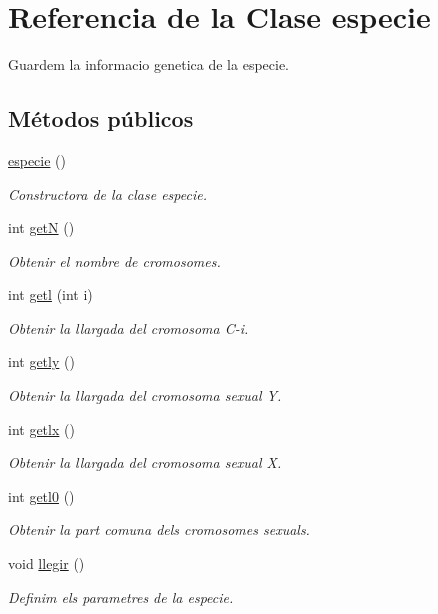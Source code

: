 \hypertarget{classespecie}{}\section{Referencia de la Clase especie}
\label{classespecie}


Guardem la informacio genetica de la especie.  


\subsection*{Métodos públicos}
\begin{DoxyCompactItemize}
\item 
\hyperlink{classespecie_ac172ff6414744de38a9995de5b8960e6}{especie} ()
\begin{DoxyCompactList}\small\item\em Constructora de la clase especie. \end{DoxyCompactList}\item 
int \hyperlink{classespecie_a16cbac301660254cf39ef7f51690e507}{getN} ()
\begin{DoxyCompactList}\small\item\em Obtenir el nombre de cromosomes. \end{DoxyCompactList}\item 
int \hyperlink{classespecie_ac09e154b4eae25155af3bdc98c2a18c3}{getl} (int i)
\begin{DoxyCompactList}\small\item\em Obtenir la llargada del cromosoma C-\/i. \end{DoxyCompactList}\item 
int \hyperlink{classespecie_aeae1b17938e4527858ad4d3f5949d182}{getly} ()
\begin{DoxyCompactList}\small\item\em Obtenir la llargada del cromosoma sexual Y. \end{DoxyCompactList}\item 
int \hyperlink{classespecie_a98735feb10fd44e1316708566790ca95}{getlx} ()
\begin{DoxyCompactList}\small\item\em Obtenir la llargada del cromosoma sexual X. \end{DoxyCompactList}\item 
int \hyperlink{classespecie_a5ea723fe64398cd46cbc6e044b114fff}{getl0} ()
\begin{DoxyCompactList}\small\item\em Obtenir la part comuna dels cromosomes sexuals. \end{DoxyCompactList}\item 
void \hyperlink{classespecie_af1a08ff40fdb79abb1d78c06b8131306}{llegir} ()
\begin{DoxyCompactList}\small\item\em Definim els parametres de la especie. \end{DoxyCompactList}\end{DoxyCompactItemize}
